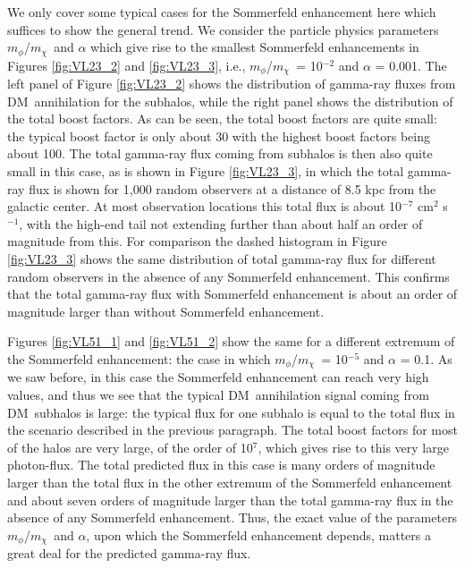 \documentclass[aps,prd,twocolumn,amsmath,amssymb,floatfix,nofootinbib,10pt]{revtex4}
\newcommand{\ie}{i.e.}
\newcommand{\DM}{DM}
\newcommand{\mdm}{\ensuremath{m_{\chi}}}
\newcommand{\mv}{\ensuremath{m_{\phi}}}
\begin{document}
We only cover some typical cases for the Sommerfeld enhancement here
which suffices to show the general trend. We consider the particle
physics parameters \mv/\mdm\ and $\alpha$ which give rise to the
smallest Sommerfeld enhancements in Figures \ref{fig:VL23_2} and
\ref{fig:VL23_3}, \ie, \mv/\mdm\ = 10$^{-2}$ and $\alpha$ = 0.001. The
left panel of Figure \ref{fig:VL23_2} shows the distribution of
gamma-ray fluxes from \DM\ annihilation for the subhalos, while the
right panel shows the distribution of the total boost factors. As can
be seen, the total boost factors are quite small: the typical boost
factor is only about 30 with the highest boost factors being about
100. The total gamma-ray flux coming from subhalos is then also quite
small in this case, as is shown in Figure \ref{fig:VL23_3}, in which
the total gamma-ray flux is shown for 1,000 random observers at a
distance of 8.5 kpc from the galactic center. At most observation
locations this total flux is about 10$^{-7}$ cm$^2$ s$^{-1}$, with the
high-end tail not extending further than about half an order of
magnitude from this. For comparison the dashed histogram in Figure
\ref{fig:VL23_3} shows the same distribution of total gamma-ray flux
for different random observers in the absence of any Sommerfeld
enhancement. This confirms that the total gamma-ray flux with
Sommerfeld enhancement is about an order of magnitude larger than
without Sommerfeld enhancement. 

Figures \ref{fig:VL51_1} and \ref{fig:VL51_2} show the same for a
different extremum of the Sommerfeld enhancement: the case in which
\mv/\mdm\ = 10$^{-5}$ and $\alpha$ = 0.1. As we saw before, in this
case the Sommerfeld enhancement can reach very high values, and thus
we see that the typical \DM\ annihilation signal coming from \DM\
subhalos is large: the typical flux for one subhalo is equal to the
total flux in the scenario described in the previous paragraph. The
total boost factors for most of the halos are very large, of the order
of 10$^7$, which gives rise to this very large photon-flux. The total
predicted flux in this case is many orders of magnitude larger than
the total flux in the other extremum of the Sommerfeld enhancement and
about seven orders of magnitude larger than the total gamma-ray flux
in the absence of any Sommerfeld enhancement. Thus, the exact value of
the parameters \mv/\mdm\ and $\alpha$, upon which the Sommerfeld
enhancement depends, matters a great deal for the predicted gamma-ray
flux.
\end{document}
